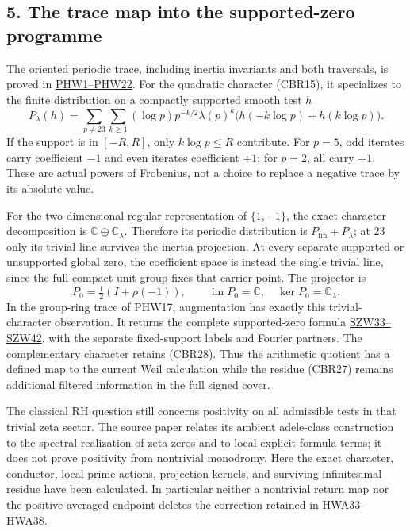 \documentclass[
  10pt,
  a4paper,
]{article}
\begin{document}
\subsection{5. The trace map into the supported-zero
programme}\label{the-trace-map-into-the-supported-zero-programme}

The oriented periodic trace, including inertia invariants and both
traversals, is proved in
\href{https://github.com/KokunoYumeto/zeta-function-research-reader/blob/4a4238afc992e77aee83b97d38a1a63d283f540c/workbenches/splitzero-tandem/branches/tau-zero-prime-positivity/PRIME_HOLONOMY_SUPPORTED_WEIL_DERIVATION.md}{PHW1--PHW22}.
For the quadratic character (CBR15), it specializes to the finite
distribution on a compactly supported smooth test \(h\) \[
P_{\lambda}(h)=\sum_{p\ne23}\sum_{k\ge1}
(\log p)p^{-k/2}\lambda(p)^k
\bigl(h(-k\log p)+h(k\log p)\bigr).
\tag{CBR28}
\] If the support is in \([-R,R]\), only \(k\log p\le R\) contribute.
For \(p=5\), odd iterates carry coefficient \(-1\) and even iterates
coefficient \(+1\); for \(p=2\), all carry \(+1\). These are actual
powers of Frobenius, not a choice to replace a negative trace by its
absolute value.

For the two-dimensional regular representation of \(\{1,-1\}\), the
exact character decomposition is \(\mathbb C\oplus\mathbb C_\lambda\).
Therefore its periodic distribution is \(P_{\mathrm{fin}}+P_\lambda\);
at 23 only its trivial line survives the inertia projection. At every
separate supported or unsupported global zero, the coefficient space is
instead the single trivial line, since the full compact unit group fixes
that carrier point. The projector is \[
P_0=\tfrac12(I+\rho(-1)),\qquad
\operatorname{im}P_0=\mathbb C,\quad
\ker P_0=\mathbb C_\lambda.
\tag{CBR29}
\] In the group-ring trace of PHW17, augmentation has exactly this
trivial-character observation. It returns the complete supported-zero
formula
\href{https://github.com/KokunoYumeto/zeta-function-research-reader/blob/adfbfe74fa49e31cb7aa068cf755fb083be37c32/workbenches/splitzero-tandem/branches/tau-zero-prime-positivity/SUPPORTED_ZERO_PRIME_WEIL_DERIVATION.md}{SZW33--SZW42},
with the separate fixed-support labels and Fourier partners. The
complementary character retains (CBR28). Thus the arithmetic quotient
has a defined map to the current Weil calculation while the residue
(CBR27) remains additional filtered information in the full signed
cover.

The classical RH question still concerns positivity on all admissible
tests in that trivial zeta sector. The source paper relates its ambient
adele-class construction to the spectral realization of zeta zeros and
to local explicit-formula terms; it does not prove positivity from
nontrivial monodromy. Here the exact character, conductor, local prime
actions, projection kernels, and surviving infinitesimal residue have
been calculated. In particular neither a nontrivial return map nor the
positive averaged endpoint deletes the correction retained in
HWA33--HWA38.
\end{document}
